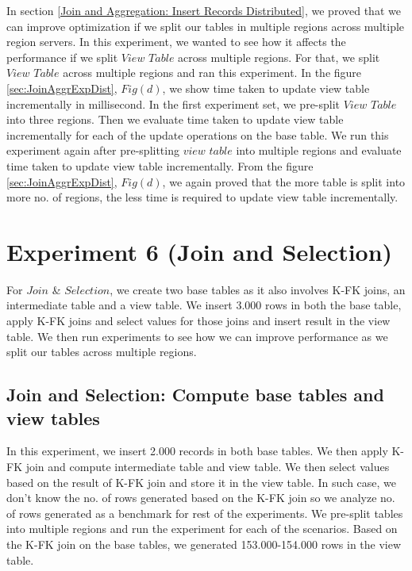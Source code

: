 \documentclass[11pt,a4paper,bibtotoc,idxtotoc,headsepline,footsepline,footexclude,BCOR12mm,DIV13]{scrbook}
\begin{document}
In section \ref{Join and Aggregation: Insert Records Distributed},  we proved that we can improve optimization if we split our tables in multiple regions across multiple region servers. In this experiment, we wanted to see how it affects the performance if we split $View$ $Table$ across multiple regions. For that, we split $View$ $Table$ across multiple regions and ran this experiment. 
In the figure \ref{sec:JoinAggrExpDist}, $Fig(d)$, we show time taken to update view table incrementally in millisecond. In the first experiment set, we pre-split $View$ $Table$ into three regions. Then we evaluate time taken to update view table incrementally for each of the update operations on the base table. We run this experiment again after pre-splitting $view$ $table$ into multiple regions and evaluate time taken to update view table incrementally. From the figure \ref{sec:JoinAggrExpDist}, $Fig(d)$, we again proved that the more table is split into more no. of regions, the less time is required to update view table incrementally. 

\section{Experiment 6 (Join and Selection)}
\label{(sec:Join and Selection Exp Distributed)} 
For $Join$ \& $Selection$, we create two base tables as it also involves K-FK joins, an intermediate table and a view table. We insert 3.000 rows in both the base table, apply K-FK joins and select values for those joins and insert result in the view table. We then run experiments to see how we can improve performance as we split our tables across multiple regions.

\subsection{Join and Selection: Compute base tables and view tables}
\label{Join and Selection: Compute base tables and view table}
In this experiment, we insert 2.000 records in both base tables. We then apply K-FK join and compute intermediate table and view table. We then select values based on the result of K-FK join and store it in the view table. In such case, we don't know the no. of rows generated based on the K-FK join so we analyze no. of rows generated as a benchmark for rest of the experiments. We pre-split tables into multiple regions and run the experiment for each of the scenarios. Based on the K-FK join on the base tables, we generated 153.000-154.000 rows in the view table.
\end{document}
